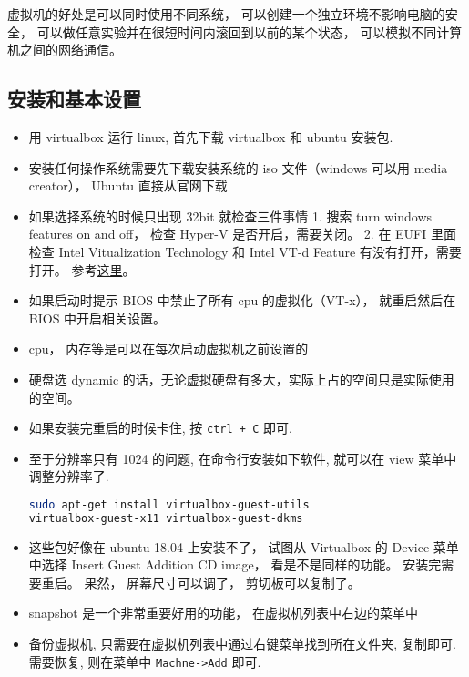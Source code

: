 
\begin{issues}
\issueDraft
\end{issues}

虚拟机的好处是可以同时使用不同系统， 可以创建一个独立环境不影响电脑的安全， 可以做任意实验并在很短时间内滚回到以前的某个状态， 可以模拟不同计算机之间的网络通信。

\subsection{安装和基本设置}

\begin{itemize}
\item 用 virtualbox 运行 linux, 首先下载 virtualbox 和 ubuntu 安装包.
\item 安装任何操作系统需要先下载安装系统的 iso 文件（windows 可以用 media creator）， Ubuntu 直接从官网下载
\item 如果选择系统的时候只出现 32bit 就检查三件事情 1. 搜索 turn windows features on and off， 检查 Hyper-V 是否开启，需要关闭。 2. 在 EUFI 里面检查 Intel Vitualization Technology 和 Intel VT-d Feature 有没有打开，需要打开。 参考\href{http://www.fixedbyvonnie.com/2014/11/virtualbox-showing-32-bit-guest-versions-64-bit-host-os/}{这里}。
\item 如果启动时提示 BIOS 中禁止了所有 cpu 的虚拟化（VT-x）， 就重启然后在 BIOS 中开启相关设置。
\item cpu， 内存等是可以在每次启动虚拟机之前设置的
\item 硬盘选 dynamic 的话，无论虚拟硬盘有多大，实际上占的空间只是实际使用的空间。
\item 如果安装完重启的时候卡住, 按 \verb|ctrl + C| 即可.
\item 至于分辨率只有 1024 的问题, 在命令行安装如下软件, 就可以在 view 菜单中调整分辨率了.
\begin{lstlisting}[language=bash]
sudo apt-get install virtualbox-guest-utils
virtualbox-guest-x11 virtualbox-guest-dkms
\end{lstlisting}
\item 这些包好像在 ubuntu 18.04 上安装不了， 试图从 Virtualbox 的 Device 菜单中选择 Insert Guest Addition CD image， 看是不是同样的功能。 安装完需要重启。 果然， 屏幕尺寸可以调了， 剪切板可以复制了。
\item snapshot 是一个非常重要好用的功能， 在虚拟机列表中右边的菜单中
\item 备份虚拟机, 只需要在虚拟机列表中通过右键菜单找到所在文件夹, 复制即可. 需要恢复, 则在菜单中 \verb|Machne->Add| 即可.

\end{itemize}

